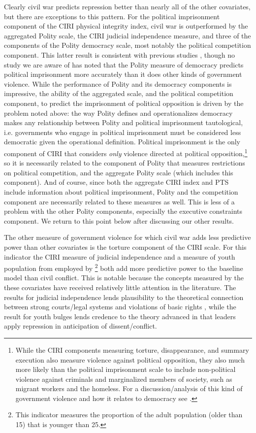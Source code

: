 \documentclass[11pt]{article}
\begin{document}
Clearly civil war predicts repression better than nearly all of the other covariates, but there are exceptions to this pattern. For the political imprisonment component of the CIRI physical integrity index, civil war is outperformed by the aggregated Polity scale, the CIRI judicial independence measure, and three of the components of the Polity democracy scale, most notably the political competition component. This latter result is consistent with previous studies \citep{Keith2002PRQ,BDMetal2005}, though no study we are aware of has noted that the Polity measure of democracy predicts political imprisonment more accurately than it does other kinds of government violence. While the performance of Polity and its democracy components is impressive, the ability of the aggregated scale, and the political competition component, to predict the imprisonment of political opposition is driven by the problem noted above: the way Polity defines and operationalizes democracy makes any relationship between Polity and political imprisonment tautological, i.e. governments who engage in political imprisonment must be considered less democratic given the operational definition. Political imprisonment is the only component of CIRI that considers {\em only} violence directed at political opposition,\footnote{While the CIRI components measuring torture, disappearance, and summary execution also measure violence against political opposition, they also much more likely than the political imprisonment scale to include non-political violence against criminals and marginalized members of society, such as migrant workers and the homeless. For a discussion/analysis of this kind of government violence and how it relates to democracy see \citet{Haschke2011}.} so it is necessarily related to the component of Polity that measures restrictions on political competition, and the aggregate Polity scale (which includes this component). And of course, since both the aggregate CIRI index and PTS include information about political imprisonment, Polity and the competition component are necessarily related to these measures as well. This is less of a problem with the other Polity components, especially the executive constraints component. 
We return to this point below after discussing our other results.

The other measure of government violence for which civil war adds less predictive power than other covariates is the torture component of the CIRI scale. For this indicator the CIRI measure of judicial independence and a measure of youth population from \citet{Urdal2006} employed by \citet{NordasDavenport2013}\footnote{This indicator measures the proportion of the adult population (older than 15) that is younger than 25.} both add more predictive power to the baseline model than civil conflict. This is notable because the concepts measured by the these covariates have received relatively little attention in the literature. The results for judicial independence lends plausibility to the theoretical connection between strong courts/legal systems and violations of basic rights \citep[E.g.,][]{NorthWeingast1989}, while the result for youth bulges lends credence to the theory advanced in \citet{NordasDavenport2013} that leaders apply repression in anticipation of dissent/conflict. 
\end{document}
